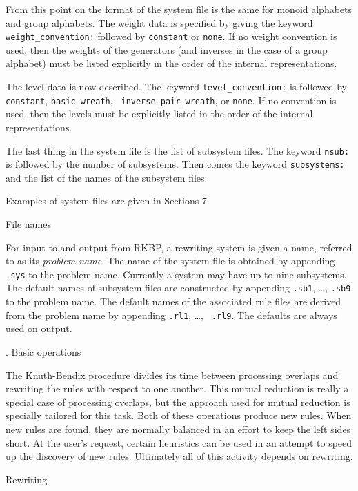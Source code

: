 From this point on the format of the system file is the same for
monoid alphabets and group alphabets.  The weight data is specified by
giving the keyword {\tt weight\_convention:} followed by {\tt constant}
or {\tt none}.  If no weight convention is used, then the weights of
the generators (and inverses in the case of a group alphabet) must be
listed explicitly in the order of the internal representations.

The level data is now described.  The keyword {\tt level\_convention:}
is followed by {\tt constant}, {\tt basic\_wreath}, {\tt
inverse\_pair\_wreath}, or {\tt none}.  If no convention is used, then
the levels must be explicitly listed in the order of the internal
representations.

The last thing in the system file is the list of subsystem files.  The
keyword {\tt nsub:} is followed by the number of subsystems.  Then
comes the keyword {\tt subsystems:} and the list of the names of the
subsystem files.

Examples of system files are given in Sections 7.

\bigskip
{}  File names

\nobreak

For input to and output from RKBP, a rewriting system is given a name,
referred to as its {\it problem name}.  The name of the system file is
obtained by appending {\tt .sys} to the problem name.  Currently a
system may have up to nine subsystems.  The default names of subsystem
files are constructed by appending {\tt .sb1}, \dots, {\tt .sb9} to
the problem name.  The default names of the associated rule files are
derived from the problem name by appending {\tt .rl1}, \dots, {\tt
.rl9}.  The defaults are always used on output.

\bigskip
{}. Basic operations

\nobreak

The Knuth-Bendix procedure divides its time between processing
overlaps and rewriting the rules with respect to one another. This
mutual reduction is really a special case of processing overlaps, but
the approach used for mutual reduction is specially tailored for this
task. Both of these operations produce new rules. When new rules are
found, they are normally balanced in an effort to keep the left sides
short.  At the user's request, certain heuristics can be used in an
attempt to speed up the discovery of new rules.  Ultimately all of
this activity depends on rewriting.


\bigskip
{} Rewriting

